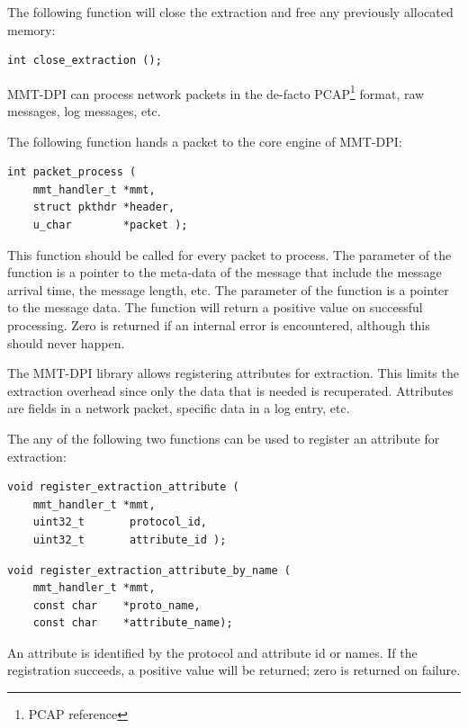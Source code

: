 The following function will close the extraction and free any previously allocated memory:

\begin{lstlisting}[style=Cpp]
int close_extraction ();
\end{lstlisting}

MMT-DPI can process network packets in the de-facto PCAP\footnote{PCAP reference} format, raw messages, log messages, etc. 

The following function hands a packet to the core engine of MMT-DPI:

\begin{lstlisting}[style=Cpp]
int packet_process (
    mmt_handler_t *mmt,
    struct pkthdr *header,
    u_char        *packet );
\end{lstlisting}

This function should be called for every packet to process. The  parameter of the function is a pointer to the meta-data of the message that include the message arrival time, the message length, etc. The  parameter of the function is a pointer to the message data. The  function will return a positive value on successful processing. Zero is returned if an internal error is encountered, although this should never happen.

The MMT-DPI library allows registering attributes for extraction. This limits the extraction overhead since only the data that is needed is recuperated. Attributes are fields in a network packet, specific data in a log entry, etc. 


The any of the following two functions can be used to register an attribute for extraction:

\begin{lstlisting}[style=Cpp]
void register_extraction_attribute (
    mmt_handler_t *mmt,
    uint32_t       protocol_id, 
    uint32_t       attribute_id );
\end{lstlisting}

\begin{lstlisting}[style=Cpp]
void register_extraction_attribute_by_name (
    mmt_handler_t *mmt,
    const char    *proto_name,
    const char    *attribute_name);
\end{lstlisting}

An attribute is identified by the protocol and attribute id or names. If the registration succeeds, a positive value will be returned; zero is returned on failure.

